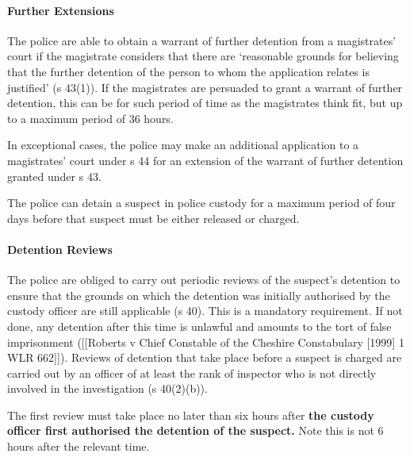 \documentclass[
]{article}
\newenvironment{Shaded}{}{}
\newcommand{\NormalTok}[1]{#1}
\begin{document}
\hypertarget{further-extensions}{%
\paragraph{Further Extensions}\label{further-extensions}}

The police are able to obtain a warrant of further detention from a
magistrates' court if the magistrate considers that there are
`reasonable grounds for believing that the further detention of the
person to whom the application relates is justified' (s 43(1)). If the
magistrates are persuaded to grant a warrant of further detention, this
can be for such period of time as the magistrates think fit, but up to a
maximum period of 36 hours.

In exceptional cases, the police may make an additional application to a
magistrates' court under s 44 for an extension of the warrant of further
detention granted under s 43.

\begin{Shaded}
\begin{Highlighting}[]
\NormalTok{The police can detain a suspect in police custody for a maximum period of four days before that suspect must be either released or charged.}
\end{Highlighting}
\end{Shaded}

\hypertarget{detention-reviews}{%
\paragraph{Detention Reviews}\label{detention-reviews}}

The police are obliged to carry out periodic reviews of the suspect's
detention to ensure that the grounds on which the detention was
initially authorised by the custody officer are still applicable (s 40).
This is a mandatory requirement. If not done, any detention after this
time is unlawful and amounts to the tort of false imprisonment
({[}{[}Roberts v Chief Constable of the Cheshire Constabulary {[}1999{]}
1 WLR 662{]}{]}). Reviews of detention that take place before a suspect
is charged are carried out by an officer of at least the rank of
inspector who is not directly involved in the investigation (s
40(2)(b)).

The first review must take place no later than six hours after
\textbf{the custody officer first authorised the detention of the
suspect.} Note this is not 6 hours after the relevant time.
\end{document}

